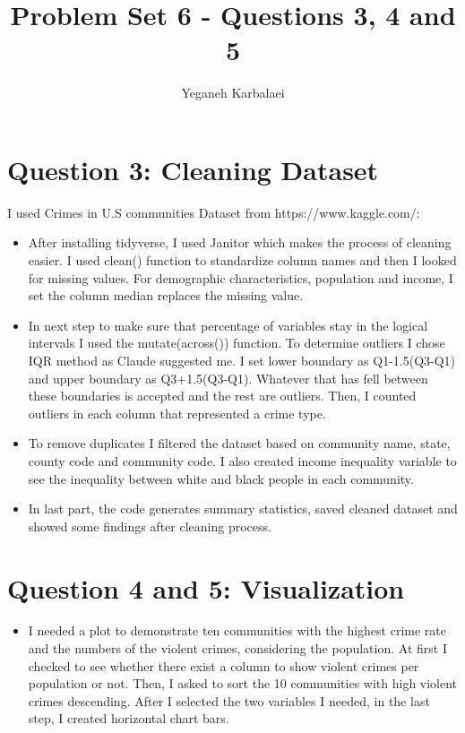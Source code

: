 \documentclass{article}
\title{Problem Set 6 - Questions 3, 4 and 5}
\author{Yeganeh Karbalaei}
\date{}
\begin{document}
\maketitle
\section{Question 3: Cleaning Dataset}
I used Crimes in U.S communities Dataset from https://www.kaggle.com/:
\begin{itemize}
    \item After installing tidyverse, I used Janitor which makes the process of cleaning easier. I used clean() function to standardize column names and then I looked for missing values. For demographic characteristics, population and income, I set the column median replaces the missing value.  
    \item In next step to make sure that percentage of variables stay in the logical intervals I used the mutate(across()) function. To determine outliers I chose IQR method as Claude suggested me. I set lower boundary as Q1-1.5(Q3-Q1) and upper boundary as Q3+1.5(Q3-Q1). Whatever that has fell between these boundaries is accepted and the rest are outliers. Then, I counted outliers in each column that represented a crime type. 
    \item To remove duplicates I filtered the dataset based on community name, state, county code and community code. I also created income inequality variable to see the inequality between white and black people in each community. 
    \item In last part, the code generates summary statistics, saved cleaned dataset and showed some findings after cleaning process. 
\end{itemize}

\section{Question 4 and 5: Visualization}

\begin{itemize}
    \item I needed a plot to demonstrate ten communities with the highest crime rate and the numbers of the violent crimes, considering the population. At first I checked to see whether there exist a column to show violent crimes per population or not. Then, I asked to sort the 10 communities with high violent crimes descending. After I selected the two variables I needed, in the last step, I created horizontal chart bars.
\end{itemize}
\end{document}
